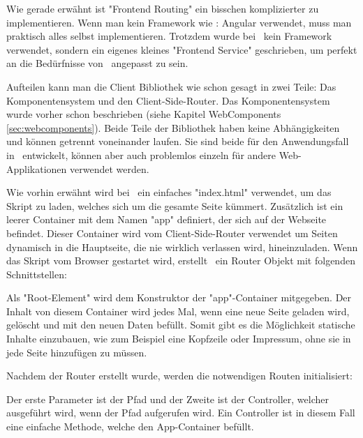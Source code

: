 
Wie gerade erwähnt ist "Frontend Routing" ein bisschen komplizierter zu implementieren. Wenn man kein Framework wie \zb: Angular verwendet, muss man praktisch alles selbst implementieren. Trotzdem wurde bei \ZELIA\ kein Framework verwendet, sondern  ein eigenes kleines "Frontend Service" geschrieben, um perfekt an die Bedürfnisse von \ZELIA\ angepasst zu sein.

Aufteilen kann man die Client Bibliothek wie schon gesagt in zwei Teile: Das Komponentensystem und den Client-Side-Router. Das Komponentensystem wurde vorher schon beschrieben (siehe Kapitel WebComponents \ref{sec:webcomponents}). Beide Teile der Bibliothek haben keine Abhängigkeiten und können getrennt voneinander laufen. Sie sind beide für den Anwendungsfall in \ZELIA\ entwickelt, können aber auch problemlos einzeln für andere Web-Applikationen verwendet werden.

Wie vorhin erwähnt wird bei \ZELIA\ ein einfaches "index.html" verwendet, um das Skript zu laden, welches sich um die gesamte Seite kümmert. Zusätzlich ist ein leerer Container mit dem Namen "app" definiert, der sich auf der Webseite befindet. Dieser Container wird vom Client-Side-Router verwendet um Seiten dynamisch in die Hauptseite, die nie wirklich verlassen wird, hineinzuladen. Wenn das Skript vom Browser gestartet wird, erstellt \ZELIA\ ein Router Objekt mit folgenden Schnittstellen:


Als "Root-Element" wird dem Konstruktor der "app"-Container mitgegeben. Der Inhalt von diesem Container wird jedes Mal, wenn eine neue Seite geladen wird, gelöscht und mit den neuen Daten befüllt. Somit gibt es die Möglichkeit statische Inhalte einzubauen, wie zum Beispiel eine Kopfzeile oder Impressum, ohne sie in jede Seite hinzufügen zu müssen.

Nachdem der Router erstellt wurde, werden die notwendigen Routen initialisiert:



Der erste Parameter ist der Pfad und der Zweite ist der Controller, welcher ausgeführt wird, wenn der Pfad aufgerufen wird. Ein Controller ist in diesem Fall eine einfache Methode, welche den App-Container befüllt.


